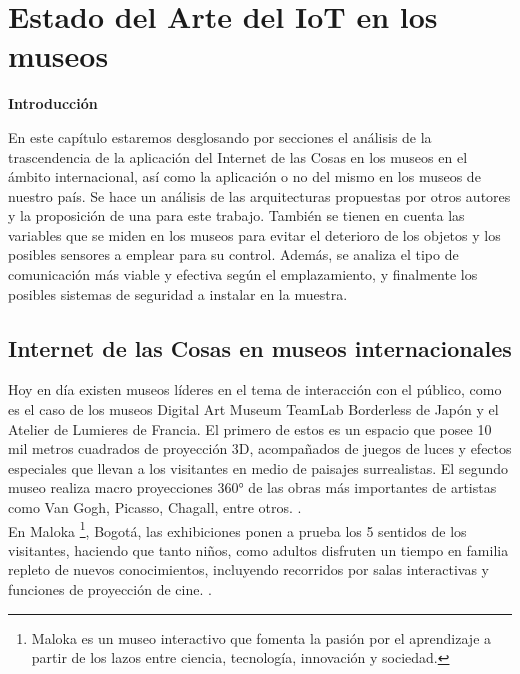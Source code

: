 \chapter{Estado del Arte del IoT en los museos} \label{cap:aproxTeoricas}

        \textbf{\Large Introducción}\newline

        En este capítulo estaremos desglosando por secciones el análisis de la trascendencia de la aplicación del Internet de las Cosas en los museos en el ámbito internacional, así como la aplicación o no del mismo en los museos de nuestro país.
        Se hace un análisis de las arquitecturas propuestas por otros autores y la proposición de una para este trabajo.
        También se tienen en cuenta las variables que se miden en los museos para evitar el deterioro de los objetos y los posibles sensores a emplear para su control.
        Además, se analiza el tipo de comunicación más viable y efectiva según el emplazamiento, y finalmente los posibles sistemas de seguridad a instalar en la muestra.
    
    \section{Internet de las Cosas en museos internacionales}\label{sec:iotMundo}
        
        Hoy en día existen museos líderes en el tema de interacción con el público, como es el caso de los museos Digital Art Museum TeamLab Borderless de Japón y el Atelier de Lumieres de Francia. El primero de estos es un espacio que posee 10 mil metros cuadrados de proyección 3D, acompañados de juegos de luces y efectos especiales que llevan a los visitantes en medio de paisajes surrealistas. El segundo museo realiza macro proyecciones 360° de las obras más importantes de artistas como Van Gogh, Picasso, Chagall, entre otros. \cite{museoInterSalaLimpia}.\\
        
        En Maloka \footnote{Maloka es un museo interactivo que fomenta la pasión por el aprendizaje a partir de los lazos entre ciencia, tecnología, innovación y sociedad.}, Bogotá, las exhibiciones ponen a prueba los 5 sentidos de los visitantes, haciendo que tanto niños, como adultos disfruten un tiempo en familia repleto de nuevos conocimientos, incluyendo recorridos por salas interactivas y funciones de proyección de cine. \cite{maloka}.\\


